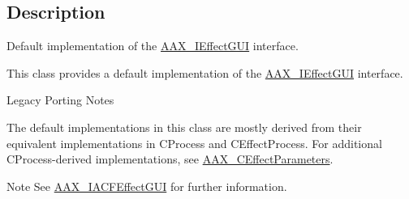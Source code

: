 \subsection{Description}
Default implementation of the \mbox{\hyperlink{a01821}{A\+A\+X\+\_\+\+I\+Effect\+G\+UI}} interface. 

This class provides a default implementation of the \mbox{\hyperlink{a01821}{A\+A\+X\+\_\+\+I\+Effect\+G\+UI}} interface.

\begin{DoxyRefDesc}{Legacy Porting Notes}
\item[\mbox{\hyperlink{a00787__porting_notes000005}{Legacy Porting Notes}}]The default implementations in this class are mostly derived from their equivalent implementations in C\+Process and C\+Effect\+Process. For additional C\+Process-\/derived implementations, see \mbox{\hyperlink{a01481}{A\+A\+X\+\_\+\+C\+Effect\+Parameters}}.\end{DoxyRefDesc}


\begin{DoxyNote}{Note}
See \mbox{\hyperlink{a01665}{A\+A\+X\+\_\+\+I\+A\+C\+F\+Effect\+G\+UI}} for further information. 
\end{DoxyNote}
